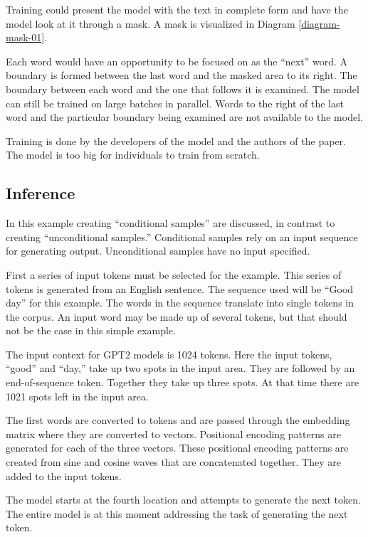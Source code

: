 Training could present the model with the text in complete form and have the model look at it through a mask. A mask is visualized in Diagram \ref{diagram-mask-01}.

Each word would have an opportunity to be focused on as the ``next'' word. A boundary is formed between the last word and the masked area to its right. The boundary between each word and the one that follows it is examined. The model can still be trained on large batches in parallel. Words to the right of the last word and the particular boundary being examined are not available to the model.

Training is done by the developers of the model and the authors of the paper. The model is too big for individuals to train from scratch. 

\subsection{Inference}

In this example creating ``conditional samples'' are discussed, in contrast to creating ``unconditional samples.'' Conditional samples rely on an input sequence for generating output. Unconditional samples have no input specified. %

First a series of input tokens must be selected for the example. This series of tokens is generated from an English sentence. The sequence used will be ``Good day'' for this example. The words in the sequence translate into single tokens in the corpus. An input word may be made up of several tokens, but that should not be the case in this simple example.

The input context for GPT2 models is 1024 tokens. Here the input tokens, ``good'' and ``day,''  take up two spots in the input area. They are followed by an end-of-sequence token. Together they take up three spots. At that time there are 1021 spots left in the input area.

The first words are converted to tokens and are passed through the embedding matrix where they are converted to vectors. Positional encoding patterns are generated for each of the three vectors. These positional encoding patterns are created from sine and cosine waves that are concatenated together. They are added to the input tokens.

The model starts at the fourth location and attempts to generate the next token. The entire model is at this moment addressing the task of generating the next token.

